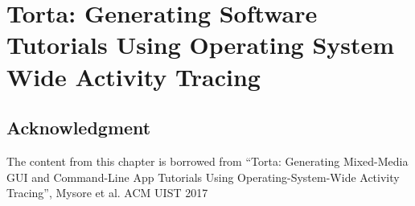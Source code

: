 \chapter{Torta: Generating Software Tutorials Using Operating System Wide Activity Tracing}







\section{Acknowledgment}
The content from this chapter is borrowed from ``Torta: Generating Mixed-Media GUI and Command-Line App Tutorials Using Operating-System-Wide Activity Tracing'', Mysore et al. ACM UIST 2017~\cite{MysoreUIST2017}
